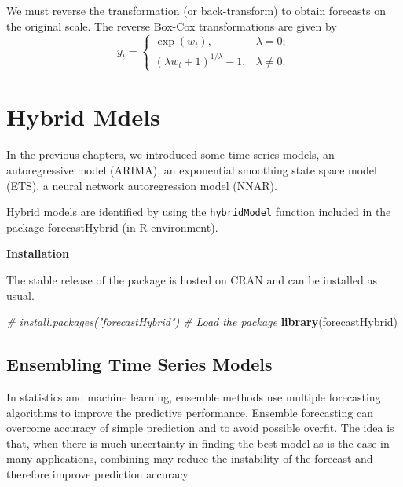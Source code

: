 \documentclass[]{book}
\newenvironment{Shaded}{\begin{snugshade}}{\end{snugshade}}
\newcommand{\KeywordTok}[1]{\textcolor[rgb]{0.13,0.29,0.53}{\textbf{#1}}}
\newcommand{\CommentTok}[1]{\textcolor[rgb]{0.56,0.35,0.01}{\textit{#1}}}
\newcommand{\NormalTok}[1]{#1}
\begin{document}
We must reverse the transformation (or back-transform) to obtain
forecasts on the original scale. The reverse Box-Cox transformations are
given by \[
y_t=\left\{\begin{array}{ll}
\exp(w_t), & \lambda=0;\\
(\lambda w_t+1)^{1/\lambda}-1, & \lambda \neq 0.
\end{array}
\right.
\]

\chapter{Hybrid Mdels}\label{ensemble}

In the previous chapters, we introduced some time series models, an
autoregressive model (ARIMA), an exponential smoothing state space model
(ETS), a neural network autoregression model (NNAR).

Hybrid models are identified by using the \texttt{hybridModel} function
included in the package
\href{https://cran.r-project.org/web/packages/forecastHybrid/forecastHybrid.pdf}{forecastHybrid}
(in R environment).

\textbf{Installation}

The stable release of the package is hosted on CRAN and can be installed
as usual.

\begin{Shaded}
\begin{Highlighting}[]
\CommentTok{# install.packages("forecastHybrid")}
\CommentTok{# Load the package}
\KeywordTok{library}\NormalTok{(forecastHybrid)}
\end{Highlighting}
\end{Shaded}

\section{Ensembling Time Series
Models}\label{ensembling-time-series-models}

In statistics and machine learning, ensemble methods use multiple
forecasting algorithms to improve the predictive performance. Ensemble
forecasting can overcome accuracy of simple prediction and to avoid
possible overfit. The idea is that, when there is much uncertainty in
finding the best model as is the case in many applications, combining
may reduce the instability of the forecast and therefore improve
prediction accuracy.
\end{document}
